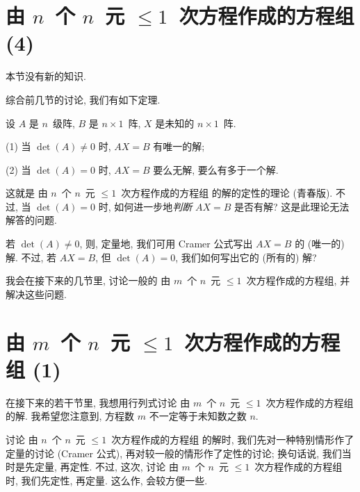 \section{\texorpdfstring{由 \(n\)~个 \(n\)~元
      \({\leq} 1\)~次方程作成的方程组 (4)}%
  {由 n 个 n 元 ≤1 次方程作成的方程组 (4)}}

\maldevigalegajxo

本节没有新的知识.

综合前几节的讨论, 我们有如下定理.

\begin{theorem}
    设 \(A\) 是 \(n\)~级阵,
    \(B\) 是 \(n \times 1\)~阵,
    \(X\) 是未知的 \(n \times 1\)~阵.

    (1)
    当 \(\det {(A)} \neq 0\) 时,
    \(AX = B\) 有唯一的解;

    (2)
    当 \(\det {(A)} = 0\) 时,
    \(AX = B\) 要么无解,
    要么有多于一个解.
\end{theorem}

这就是%
由 \(n\)~个 \(n\)~元 \({\leq} 1\)~次方程作成的方程组%
的解的定性的理论 (青春版).
不过,
当 \(\det {(A)} = 0\) 时,
如何进一步地\emph{判断} \(AX = B\) 是否有解?
这是此理论无法解答的问题.

若 \(\det {(A)} \neq 0\),
则, 定量地,
我们可用 Cramer 公式写出
\(AX = B\) 的 (唯一的) 解.
不过, 若 \(AX = B\),
但 \(\det {(A)} = 0\),
我们如何写出它的 (所有的) 解?

我会在接下来的几节里,
讨论一般的%
由 \(m\)~个 \(n\)~元 \({\leq} 1\)~次方程作成的方程组,
并解决这些问题.

\section{\texorpdfstring{由 \(m\)~个 \(n\)~元
      \({\leq} 1\)~次方程作成的方程组 (1)}%
  {由 m 个 n 元 ≤1 次方程作成的方程组 (1)}}

\maldevigalegajxo

在接下来的若干节里, 我想用行列式讨论%
由 \(m\)~个 \(n\)~元 \({\leq} 1\)~次方程作成的方程组%
的解.
我希望您注意到, 方程数 \(m\) 不一定等于未知数之数 \(n\).

讨论%
由 \(n\)~个 \(n\)~元 \({\leq} 1\)~次方程作成的方程组%
的解时,
我们先对一种特别情形作了定量的讨论
(Cramer 公式),
再对较一般的情形作了定性的讨论;
换句话说, 我们当时是先定量, 再定性.
不过, 这次,
讨论%
由 \(m\)~个 \(n\)~元 \({\leq} 1\)~次方程作成的方程组%
时, 我们先定性, 再定量.
这么作, 会较方便一些.

